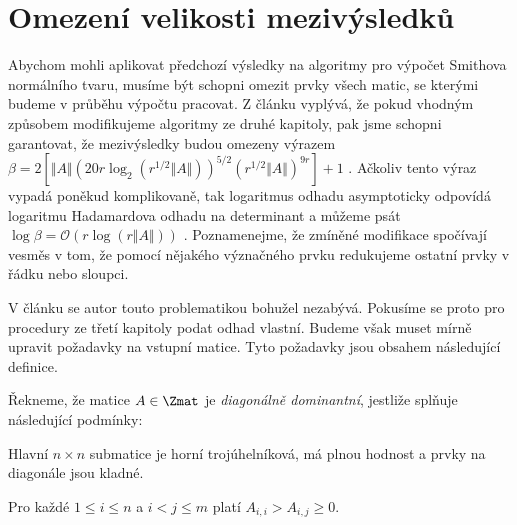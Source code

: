 \section{Omezení velikosti mezivýsledků}
Abychom mohli aplikovat předchozí výsledky na algoritmy pro výpočet Smithova
normálního tvaru, musíme být schopni omezit prvky všech matic, se kterými
budeme v průběhu výpočtu pracovat. Z článku \cite{triang} vyplývá, že pokud
vhodným způsobem modifikujeme algoritmy ze druhé kapitoly, pak jsme schopni
garantovat, že mezivýsledky budou omezeny výrazem
$ \beta = 2[\Vert A \Vert (20 r \log_2{ (r^{1/2} \Vert A \Vert) })^{5/2} (r^{1/2} \Vert A \Vert)^{9 r} ] + 1 $
\cite[Theorem 16]{triang}.
Ačkoliv tento výraz vypadá poněkud komplikovaně, tak logaritmus odhadu
asymptoticky odpovídá logaritmu Hadamardova odhadu na determinant a můžeme psát
$ \log{\beta} = \mathcal{O}(r \log{(r \Vert A \Vert)}) $ \cite[Theorem 16]{triang}.
Poznamenejme, že zmíněné modifikace spočívají vesměs v tom, že pomocí nějakého
význačného prvku redukujeme ostatní prvky v řádku nebo sloupci.

V článku \cite{SNF_Arne} se autor touto problematikou bohužel nezabývá. Pokusíme
se proto pro procedury ze třetí kapitoly podat odhad vlastní. Budeme však muset
mírně upravit požadavky na vstupní matice. Tyto požadavky jsou obsahem následující
definice.

\begin{defi}
    Řekneme, že matice $ A \in \Zmat $ je \emph{diagonálně dominantní}, jestliže
    splňuje následující podmínky:
    \begin{Cond}
        \item Hlavní $ n \times n $ submatice je horní trojúhelníková, má plnou
            hodnost a prvky na diagonále jsou kladné.
        \item Pro každé $ 1 \leq i \leq n $ a $ i < j \leq m $ platí 
            $ A_{i, i} > A_{i, j} \geq 0 $.
    \end{Cond}
\end{defi}

